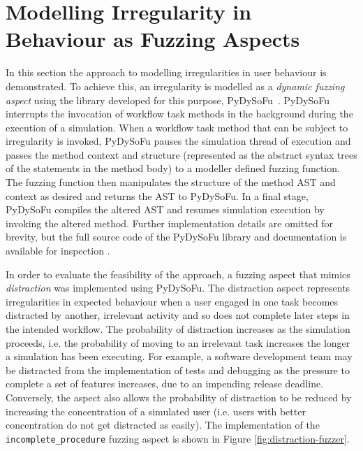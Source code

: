 \documentclass{llncs}
\begin{document}

\section{Modelling Irregularity in Behaviour as Fuzzing Aspects}
\label{sec:fuzzing}


In this section the approach to modelling irregularities in user behaviour is demonstrated.  To achieve this, an irregularity is modelled as a \emph{dynamic
  fuzzing aspect} using the library developed for this purpose, PyDySoFu~\cite{storer2016pydysofu-scm}.  PyDySoFu
interrupts the invocation of workflow task methods in the background during the execution of a simulation.  When a
workflow task method that can be subject to irregularity is invoked, PyDySoFu pauses the simulation thread of execution
and passes the method context and structure (represented as the abstract syntax trees of the statements in the method
body) to a modeller defined fuzzing function.  The fuzzing function then manipulates the structure of the method AST and
context as desired and returns the AST to PyDySoFu.  In a final stage, PyDySoFu compiles the altered AST and resumes
simulation execution by invoking the altered method.  Further implementation details are omitted for brevity, but the
full source code of the PyDySoFu library and documentation is available for inspection
\cite{storer2016pydysofu-scm}.

In order to evaluate the feasibility of the approach, a fuzzing aspect that mimics \emph{distraction} was implemented
using PyDySoFu.  The distraction aspect represents irregularities in expected behaviour when a user engaged in one task
becomes distracted by another, irrelevant activity and so does not complete later steps in the intended workflow.  The
probability of distraction increases as the simulation proceeds, i.e. the probability of moving to an irrelevant task
increases the longer a simulation has been executing.  For example, a software development team may be distracted from
the implementation of tests and debugging as the pressure to complete a set of features increases, due to an impending
release deadline.  Conversely, the aspect also allows the probability of distraction to be reduced by increasing the
concentration of a simulated user (i.e. users with better concentration do not get distracted as easily).
The implementation of the \lstinline!incomplete_procedure! fuzzing aspect is shown in Figure
\ref{fig:distraction-fuzzer}.
\end{document}
